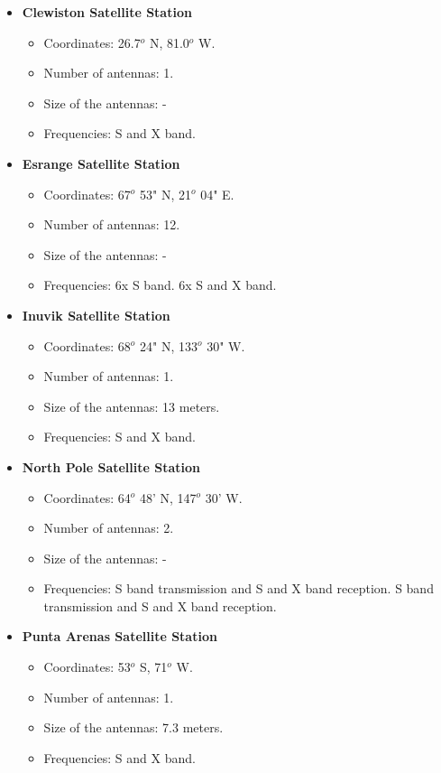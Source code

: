 \documentclass[12pt,a4paper]{report}
\begin{document}
\begin{itemize}
\item \textbf{Clewiston Satellite Station}
\begin{itemize}
\item Coordinates: 26.7$^{o}$ N, 81.0$^{o}$ W.
\item Number of antennas: 1.
\item Size of the antennas: -
\item Frequencies: S and X band.
\end{itemize}
\item \textbf{Esrange Satellite Station}
\begin{itemize}
\item Coordinates: 67$^{o}$ 53" N, 21$^{o}$ 04" E.
\item Number of antennas: 12.
\item Size of the antennas: -
\item Frequencies: 6x S band. 6x S and X band.
\end{itemize}
\item \textbf{Inuvik Satellite Station}
\begin{itemize}
\item Coordinates: 68$^{o}$ 24" N, 133$^{o}$ 30" W.
\item Number of antennas: 1.
\item Size of the antennas: 13 meters.
\item Frequencies: S and X band.
\end{itemize}
\item \textbf{North Pole Satellite Station}
\begin{itemize}
\item Coordinates: 64$^{o}$ 48' N, 147$^{o}$ 30' W.
\item Number of antennas: 2.
\item Size of the antennas: -
\item Frequencies: S band transmission and S and X band reception. S band transmission and S and X band reception.
\end{itemize}
\item \textbf{Punta Arenas Satellite Station}
\begin{itemize}
\item Coordinates: 53$^{o}$ S, 71$^{o}$ W.
\item Number of antennas: 1.
\item Size of the antennas: 7.3 meters.
\item Frequencies: S and X band.
\end{itemize}

\end{itemize}
\end{document}
